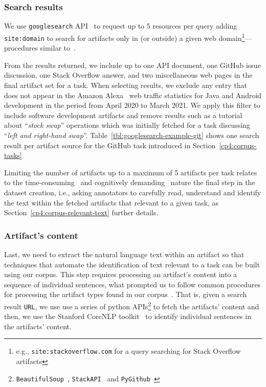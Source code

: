 \subsubsection{Search results}


We use \texttt{googlesearch} API~\cite{googlesearch} to 
request up to 5 resources per query
adding \texttt{site:domain} to search for artifacts 
only in (or outside) a given web domain\footnote{e.g., \texttt{site:stackoverflow.com} for a query searching for Stack Overflow artifacts}---procedures similar to~\cite{Xu2017}.



From the results returned, we include up to
one API document, one GitHub issue discussion, one Stack Overflow answer, and two miscellaneous web pages
in the final artifact set for a task. 
When selecting results, we exclude any entry that does not appear in the Amazon Alexa~\cite{alexa} web traffic statistics for Java and Android development in the period from April 2020 to March 2021. 
We apply this filter to include software development artifacts and remove results 
such as a tutorial about  ``\textit{stock swap}'' operations which was initially fetched 
for a task discussing ``\textit{left and right-hand swap}''.
Table~\ref{tbl:googlesearch-example-git} shows one search result per artifact source for the GitHub task introduced in Section~\ref{cp4:corpus-tasks}


Limiting the number of artifacts up to a maximum of 5 artifacts per task relates to the
time-consuming~\cite{al2017} and cognitively demanding~\cite{Piorkowski2016} 
nature the final step in the dataset creation, i.e.,  
asking annotators to carefully read, understand and identify the text
within the fetched artifacts that relevant to a given task,
as Section~\ref{cp4:corpus-relevant-text} further details.







\subsubsection{Artifact's content}

Last, we need to extract the natural language text within an artifact so that 
techniques that automate the identification of text relevant to a task can be built 
using our corpus.  This step requires processing an artifact's content 
into a sequence of individual sentences,
what prompted us to follow common procedures for processing the artifact types found in our corpus~\cite{Arya2019, nadi2020}.
That is, given a search result \texttt{URL}, we use use a series of python 
APIs\footnote{\texttt{BeautifulSoup}~\cite{beautifulsoup4},
\texttt{StackAPI}~\cite{StackAPI} and \texttt{PyGithub}~\cite{PyGithub}}
to fetch the artifacts' content
and then, we use the Stanford CoreNLP toolkit~\cite{CoreNLP} to identify 
individual sentences in the artifacts' content.











